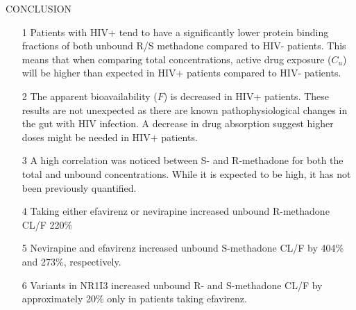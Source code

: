 \documentclass[final]{beamer}
\begin{document}
\begin{frame}[t]
\begin{columns}[t]
\begin{column}{0.9\paperwidth}
\begin{alertblock}{CONCLUSION}
\begin{itemize}
    \item[1] Patients with HIV+ tend to have a significantly lower protein binding fractions of both unbound R/S methadone compared to HIV- patients. This means that when comparing total concentrations, active drug exposure ($C_u$) will be higher than expected in HIV+ patients compared to HIV- patients.
    \item[2] The apparent bioavailability ($F$) is decreased in HIV+ patients. These results are not unexpected as there are known pathophysiological changes in the gut with HIV infection. A decrease in drug absorption suggest higher doses might be needed in HIV+ patients.
    \item[3] A high correlation was noticed between S- and R-methadone for both the total and unbound concentrations. While it is expected to be high, it has not been previously quantified.
    \item[4] Taking either efavirenz or nevirapine increased unbound R-methadone CL/F 220\%
    \item[5] Nevirapine and efavirenz increased unbound S-methadone CL/F by 404\% and 273\%, respectively.
    \item[6] Variants in NR1I3 increased unbound R- and S-methadone CL/F by approximately 20\% only in patients taking efavirenz.
\end{itemize}

    \end{alertblock}
\end{column}
\end{columns}
\end{frame}
\end{document}
